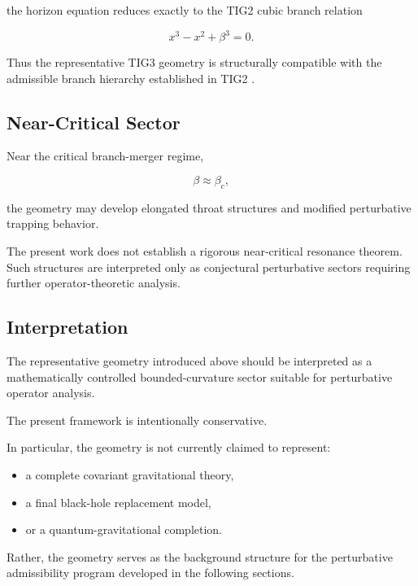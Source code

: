 the horizon equation reduces exactly to the TIG2 cubic branch relation

\begin{equation}
x^3 - x^2 + \beta^3 = 0.
\end{equation}

Thus the representative TIG3 geometry is structurally compatible with the admissible branch hierarchy established in TIG2 \cite{tig2}.


\subsection{Near-Critical Sector}

Near the critical branch-merger regime,

\begin{equation}
\beta \approx \beta_c,
\end{equation}

the geometry may develop elongated throat structures and modified perturbative trapping behavior.

The present work does not establish a rigorous near-critical resonance theorem. Such structures are interpreted only as conjectural perturbative sectors requiring further operator-theoretic analysis.


\subsection{Interpretation}

The representative geometry introduced above should be interpreted as a mathematically controlled bounded-curvature sector suitable for perturbative operator analysis.

The present framework is intentionally conservative.

In particular, the geometry is not currently claimed to represent:
\begin{itemize}[leftmargin=0.6cm]
\item a complete covariant gravitational theory,
\item a final black-hole replacement model,
\item or a quantum-gravitational completion.
\end{itemize}

Rather, the geometry serves as the background structure for the perturbative admissibility program developed in the following sections.
